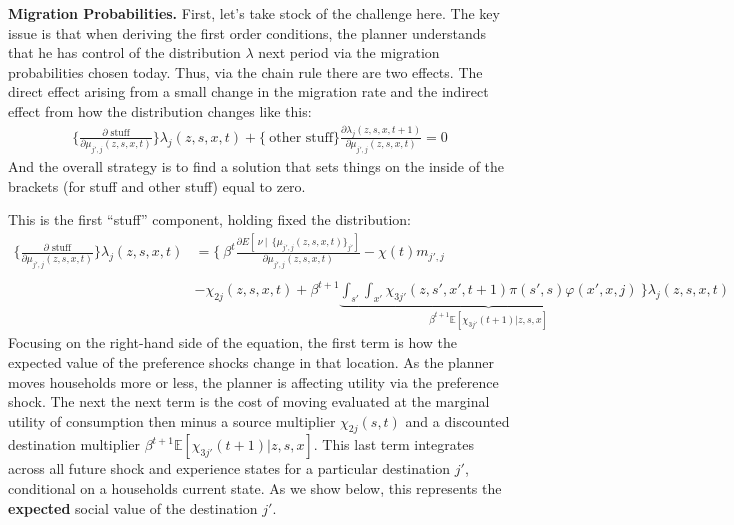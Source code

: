 \documentclass[12pt,pdftex]{article}
\begin{document}
\begin{onehalfspacing}
\textbf{Migration Probabilities.} First, let's take stock of the challenge here. The key issue is that when deriving the first order conditions, the planner understands that he has control of the distribution $\lambda$ next period via the migration probabilities chosen today. Thus, via the chain rule there are two effects. The direct effect arising from a small change in the migration rate and the indirect effect from how the distribution changes like this:
\begin{align}
\bigg \{ \frac{\partial \mbox{ stuff}}{\partial \mu_{j',j}(z, s, x, t)} \bigg \}\lambda_{j}(z, s, x, t) + \bigg \{ \ \mbox{other \ stuff} \bigg \} \frac{\partial \lambda_{j}(z, s, x,  t+1)}{\partial \mu_{j',j}(z, s, x, t)} = 0
\label{eq:stuff}
\end{align}
And the overall strategy is to find a solution that sets things on the inside of the brackets (for stuff and other stuff) equal to zero.

This is the first ``stuff'' component, holding fixed the distribution:
{\small
\begin{align}
\bigg \{\frac{\partial \mbox{ stuff}}{\partial \mu_{j',j}(z, s,x, t)} \bigg \}\lambda_{j}(z, s, x, t) &= \Bigg \{ \  \beta^{t} \frac{\partial E[\ \nu \ | \ \ \big\{\mu_{j',j}(z,s,x,t)\big\}_{j'}]}{\partial \mu_{j',j}(z,s,x,t)} - \chi(t) m_{j',j} \nonumber \\
\nonumber \\
& - \chi_{2j}(z,s,x,t)  + \beta^{t+1}\underbrace{\int_{s'}\int_{x'}\chi_{3j'}(z,s',x',t+1) \pi(s',s) \varphi(x',x, j)}_{\beta^{t+1}\mathbb{E}\left[\chi_{3j'}(t+1)|z, s, x \right]} \ \Bigg  \} \lambda_{j}(z,s,x,t)
\label{eq:first_stuff_foc}
\end{align}}Focusing on the right-hand side of the equation, the first term is how the expected value of the preference shocks change in that location. As the planner moves households more or less, the planner is affecting utility via the preference shock. The next the next term is the cost of moving evaluated at the marginal utility of consumption then minus a source multiplier $\chi_{2j}(s,t)$ and a discounted destination multiplier $\beta^{t+1}\mathbb{E}\left[\chi_{3j'}(t+1)|z, s, x \right]$. This last term integrates across all future shock and experience states for a particular destination $j'$, conditional on a households current state. As we show below, this represents the \textbf{expected} social value of the destination $j'$.


\end{onehalfspacing}
\end{document}
